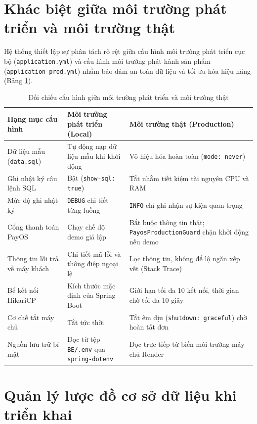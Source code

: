 \section{Khác biệt giữa môi trường phát triển và môi trường thật}
\label{sec:tk_matran}

Hệ thống thiết lập sự phân tách rõ rệt giữa cấu hình môi trường phát triển cục bộ (\texttt{application.yml}) và cấu hình môi trường phát hành sản phẩm (\texttt{application-prod.yml}) nhằm bảo đảm an toàn dữ liệu và tối ưu hóa hiệu năng (Bảng \ref{tab:tk_matran}).

\begin{table}[H]
\centering
\caption{Đối chiếu cấu hình giữa môi trường phát triển và môi trường thật}
\label{tab:tk_matran}
\small
\renewcommand{\arraystretch}{1.25}
\begin{tabular}{|p{3.4cm}|p{4.6cm}|p{5.8cm}|}
\hline
\textbf{Hạng mục cấu hình} & \textbf{Môi trường phát triển (Local)} & \textbf{Môi trường thật (Production)} \\
\hline
Dữ liệu mẫu (\texttt{data.sql}) & Tự động nạp dữ liệu mẫu khi khởi động & Vô hiệu hóa hoàn toàn (\texttt{mode: never}) \\
\hline
Ghi nhật ký câu lệnh SQL & Bật (\texttt{show-sql: true}) & Tắt nhằm tiết kiệm tài nguyên CPU và RAM \\
\hline
Mức độ ghi nhật ký & \texttt{DEBUG} chi tiết từng luồng & \texttt{INFO} chỉ ghi nhận sự kiện quan trọng \\
\hline
Cổng thanh toán PayOS & Chạy chế độ demo giả lập & Bắt buộc thông tin thật; \texttt{PayosProductionGuard} chặn khởi động nếu demo \\
\hline
Thông tin lỗi trả về máy khách & Chi tiết mã lỗi và thông điệp ngoại lệ & Lọc thông tin, không để lộ ngăn xếp vết (Stack Trace) \\
\hline
Bể kết nối HikariCP & Kích thước mặc định của Spring Boot & Giới hạn tối đa 10 kết nối, thời gian chờ tối đa 10 giây \\
\hline
Cơ chế tắt máy chủ & Tắt tức thời & Tắt êm dịu (\texttt{shutdown: graceful}) chờ hoàn tất đơn \\
\hline
Nguồn lưu trữ bí mật & Đọc từ tệp \texttt{BE/.env} qua \texttt{spring-dotenv} & Đọc trực tiếp từ biến môi trường máy chủ Render \\
\hline
\end{tabular}
\end{table}

\section{Quản lý lược đồ cơ sở dữ liệu khi triển khai}
\label{sec:tk_flyway}

